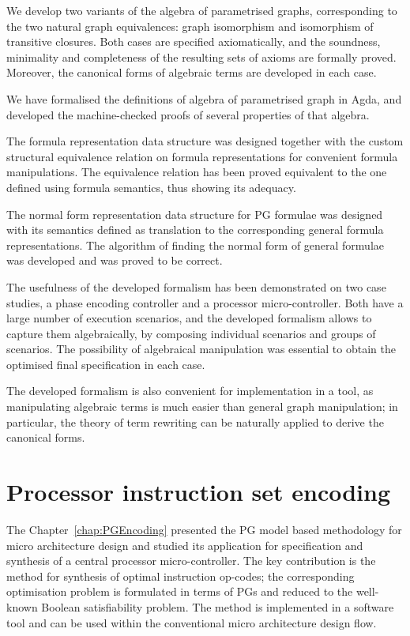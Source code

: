 We develop two variants of the algebra of parametrised graphs,
corresponding
to the two natural graph equivalences: graph isomorphism and isomorphism
of transitive closures. Both cases are specified axiomatically, and
the soundness, minimality and completeness of the resulting sets of
axioms are formally proved. Moreover, the canonical forms of algebraic
terms are developed in each case.

We have formalised the definitions of algebra of parametrised graph in
Agda, and developed the machine-checked proofs of several properties
of that algebra.

The formula representation data structure was designed together with
the custom structural equivalence relation on formula representations
for convenient formula manipulations. The equivalence relation has
been proved equivalent to the one defined using formula semantics,
thus showing its adequacy.

The normal form representation data structure for PG formulae was
designed with its semantics defined as translation to the
corresponding general formula representations. The algorithm of
finding the normal form of general formulae was developed and was
proved to be correct.

The usefulness of the developed formalism has been demonstrated on
two case studies, a phase encoding controller and a processor
micro-controller.
Both have a large number of execution scenarios, and the developed
formalism allows to capture them algebraically, by composing individual
scenarios and groups of scenarios. The possibility of algebraical
manipulation was essential to obtain the optimised final specification
in each case.

The developed formalism is also convenient for implementation in a
tool, as manipulating algebraic terms is much easier than general
graph manipulation; in particular, the theory of term rewriting can
be naturally applied to derive the canonical forms.


\section{Processor instruction set encoding}

The Chapter~\ref{chap:PGEncoding} presented the PG model based
methodology for micro architecture
design and studied its application for specification and synthesis
of a central processor micro-controller. The key contribution is
the method for synthesis of optimal instruction op-codes; the
corresponding
optimisation problem is formulated in terms of PGs and reduced to
the well-known Boolean satisfiability problem. The method is implemented
in a software tool and can be used within the conventional micro
architecture
design flow.

